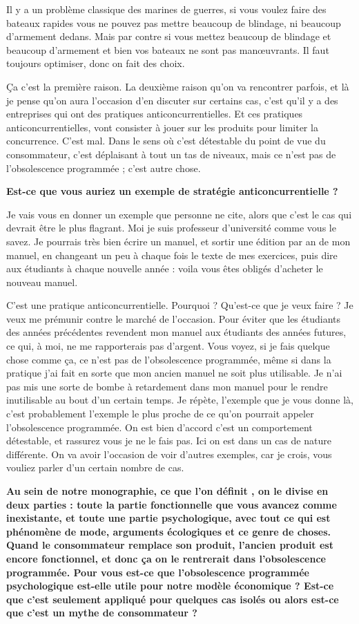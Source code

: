 \begin{small}
Il y a un problème classique des marines de guerres, si vous voulez faire des bateaux rapides vous ne pouvez pas mettre beaucoup de blindage, ni beaucoup d'armement dedans. Mais par contre si vous mettez beaucoup de blindage et beaucoup d'armement et bien vos bateaux ne sont pas manœuvrants. Il faut toujours optimiser, donc on fait des choix. 

Ça c'est la première raison. La deuxième raison qu'on va rencontrer parfois, et là je pense qu'on aura l'occasion d'en discuter sur certains cas, c'est qu'il y a  des entreprises qui ont des pratiques anticoncurrentielles. Et ces pratiques anticoncurrentielles, vont consister à jouer sur les produits pour limiter la concurrence. C'est mal. Dans le sens où c'est détestable du point de vue du consommateur, c'est déplaisant à tout un tas de niveaux, mais ce n'est pas de l'obsolescence programmée ; c'est autre chose.

\smallbreak\textbf{Est-ce que vous auriez un exemple de stratégie anticoncurrentielle ?
}\smallbreak

 Je vais vous en donner un exemple que personne ne cite, alors que c'est le cas qui devrait être le plus flagrant. Moi je suis professeur d'université comme vous le savez. Je pourrais très bien écrire un manuel, et sortir une édition par an de mon manuel, en changeant un peu à chaque fois le texte de mes exercices, puis dire aux étudiants à chaque nouvelle année  : voila vous êtes obligés d'acheter le nouveau manuel. 


C'est une pratique anticoncurrentielle. Pourquoi ? Qu'est-ce que je veux faire ?  Je veux me prémunir contre le marché de l'occasion. Pour éviter que les étudiants des années précédentes revendent mon manuel aux étudiants des années futures, ce qui, à moi, ne me rapporterais pas d'argent. Vous voyez, si je fais quelque chose comme ça, ce n'est pas de l'obsolescence programmée, même si dans la pratique j'ai fait en sorte que mon ancien manuel ne soit plus utilisable. Je n'ai pas mis une sorte de bombe à retardement dans mon manuel pour le rendre inutilisable au bout d'un certain temps. Je répète, l'exemple que je vous donne là, c'est probablement l'exemple le plus proche de ce qu'on pourrait appeler l'obsolescence programmée. On est bien d'accord c'est un comportement détestable, et rassurez vous je ne le fais pas. Ici on est dans un cas de nature différente. On va avoir l'occasion de voir d'autres exemples, car je crois, vous vouliez parler d'un certain nombre de cas.

\smallbreak\textbf{
Au sein de notre monographie, ce que l'on définit \textit{\OP}, on le divise en deux parties : toute la partie fonctionnelle que vous avancez comme inexistante, et toute une partie psychologique, avec tout ce qui est phénomène de mode, arguments écologiques et ce genre de choses. Quand le consommateur remplace son produit, l'ancien produit est encore fonctionnel, et donc ça on le rentrerait dans l'obsolescence programmée. Pour vous est-ce que l'obsolescence programmée psychologique est-elle utile pour notre modèle économique ? Est-ce que c'est seulement appliqué pour quelques cas isolés ou alors est-ce que c'est un mythe de consommateur ?
}\smallbreak


\end{small}
